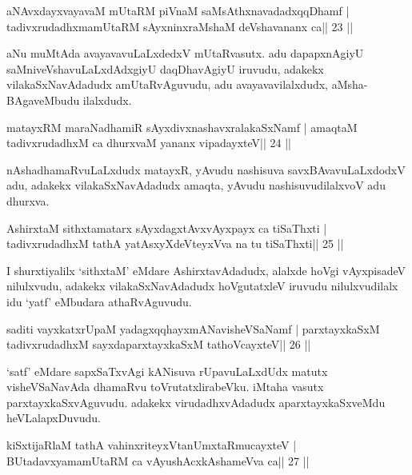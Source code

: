 \begin{shl}
aNAvxdayxvayavaM mUtaRM piVnaM saMsAthxnavadadxqqDhamf |
tadivxrudadhxmamUtaRM sAyxninxraMshaM deVshavananx ca\hfill || 23 ||
\end{shl}

\begin{artha}
aNu muMtAda avayavavuLaLxdedxV mUtaRvasutx. adu dapapxnAgiyU saMniveVshavuLaLxdAdxgiyU daqDhavAgiyU iruvudu, adakekx vilakaSxNavAdadudx amUtaRvAguvudu, adu avayavavilalxdudx, aMsha-BAgaveMbudu ilalxdudx.
\end{artha}



\begin{shl}
matayxRM maraNadhamiR sAyxdivxnashavxralakaSxNamf |
amaqtaM tadivxrudadhxM ca dhurxvaM yananx vipadayxteV\hfill || 24 ||
\end{shl}

\begin{artha}
nAshadhamaRvuLaLxdudx matayxR, yAvudu nashisuva savxBAvavuLaLxdodxV
adu, adakekx vilakaSxNavAdadudx amaqta, yAvudu nashisuvudilalxvoV adu dhurxva.
\end{artha}

\begin{shl}
AshirxtaM sithxtamatarx sAyxdagxtAvx\s vAyxpayx ca tiSaThxti |
tadivxrudadhxM tathA yatAsxyXdeVteyxVva na tu tiSaThxti\hfill || 25 ||
\end{shl}

\begin{artha}
I shurxtiyalilx `sithxtaM' eMdare AshirxtavAdadudx, alalxde hoVgi
vAyxpisadeV nilulxvudu, adakekx vilakaSxNavAdadudx hoVgutatxleV
iruvudu nilulxvudilalx idu `yatf' eMbudara athaRvAguvudu.
\end{artha}

\begin{shl}
saditi vayxkatxrUpaM yadagxqqhayxmANavisheVSaNamf |
parxtayxkaSxM tadivxrudadhxM sayxdaparxtayxkaSxM tathoVcayxteV\hfill || 26 ||
\end{shl}

\begin{artha}
`satf' eMdare sapxSaTxvAgi kANisuva rUpavuLaLxdUdx matutx visheVSaNavAda dhamaRvu toVrutatxlirabeVku. iMtaha vasutx parxtayxkaSxvAguvudu. adakekx virudadhxvAdadudx aparxtayxkaSxveMdu heVLalapxDuvudu.
\end{artha}

\begin{shl}
kiSxtijaRlaM tathA vahinxriteyxVtanUmxtaRmucayxteV |
BUtadavxyamamUtaRM ca vAyushAcx\s\s kAshameVva ca\hfill || 27 ||
\end{shl}

